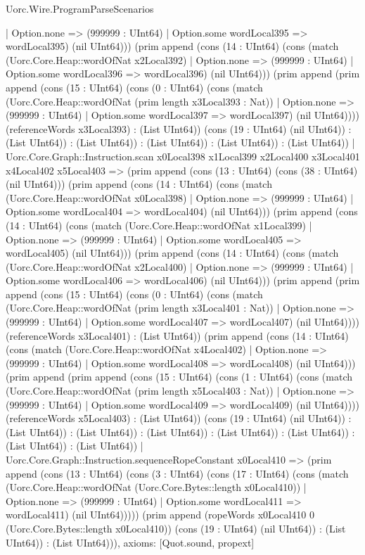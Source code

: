 \begin{lexlean}{Uorc.Wire.ProgramParseScenarios}
\begin{semanticmodule}
{      | Option.none => (999999 : UInt64)
      | Option.some wordLocal395 => wordLocal395) (nil UInt64))) (prim append (cons (14 : UInt64) (cons (match (Uorc.Core.Heap::wordOfNat x2Local392)
      | Option.none => (999999 : UInt64)
      | Option.some wordLocal396 => wordLocal396) (nil UInt64))) (prim append (prim append (cons (15 : UInt64) (cons (0 : UInt64) (cons (match (Uorc.Core.Heap::wordOfNat (prim length x3Local393 : Nat))
      | Option.none => (999999 : UInt64)
      | Option.some wordLocal397 => wordLocal397) (nil UInt64)))) (referenceWords x3Local393) : (List UInt64)) (cons (19 : UInt64) (nil UInt64)) : (List UInt64)) : (List UInt64)) : (List UInt64)) : (List UInt64)) : (List UInt64))
    | Uorc.Core.Graph::Instruction.scan x0Local398 x1Local399 x2Local400 x3Local401 x4Local402 x5Local403 => (prim append (cons (13 : UInt64) (cons (38 : UInt64) (nil UInt64))) (prim append (cons (14 : UInt64) (cons (match (Uorc.Core.Heap::wordOfNat x0Local398)
      | Option.none => (999999 : UInt64)
      | Option.some wordLocal404 => wordLocal404) (nil UInt64))) (prim append (cons (14 : UInt64) (cons (match (Uorc.Core.Heap::wordOfNat x1Local399)
      | Option.none => (999999 : UInt64)
      | Option.some wordLocal405 => wordLocal405) (nil UInt64))) (prim append (cons (14 : UInt64) (cons (match (Uorc.Core.Heap::wordOfNat x2Local400)
      | Option.none => (999999 : UInt64)
      | Option.some wordLocal406 => wordLocal406) (nil UInt64))) (prim append (prim append (cons (15 : UInt64) (cons (0 : UInt64) (cons (match (Uorc.Core.Heap::wordOfNat (prim length x3Local401 : Nat))
      | Option.none => (999999 : UInt64)
      | Option.some wordLocal407 => wordLocal407) (nil UInt64)))) (referenceWords x3Local401) : (List UInt64)) (prim append (cons (14 : UInt64) (cons (match (Uorc.Core.Heap::wordOfNat x4Local402)
      | Option.none => (999999 : UInt64)
      | Option.some wordLocal408 => wordLocal408) (nil UInt64))) (prim append (prim append (cons (15 : UInt64) (cons (1 : UInt64) (cons (match (Uorc.Core.Heap::wordOfNat (prim length x5Local403 : Nat))
      | Option.none => (999999 : UInt64)
      | Option.some wordLocal409 => wordLocal409) (nil UInt64)))) (referenceWords x5Local403) : (List UInt64)) (cons (19 : UInt64) (nil UInt64)) : (List UInt64)) : (List UInt64)) : (List UInt64)) : (List UInt64)) : (List UInt64)) : (List UInt64)) : (List UInt64))
    | Uorc.Core.Graph::Instruction.sequenceRopeConstant x0Local410 => (prim append (cons (13 : UInt64) (cons (3 : UInt64) (cons (17 : UInt64) (cons (match (Uorc.Core.Heap::wordOfNat (Uorc.Core.Bytes::length x0Local410))
      | Option.none => (999999 : UInt64)
      | Option.some wordLocal411 => wordLocal411) (nil UInt64))))) (prim append (ropeWords x0Local410 0 (Uorc.Core.Bytes::length x0Local410)) (cons (19 : UInt64) (nil UInt64)) : (List UInt64)) : (List UInt64))),
  axioms: [Quot.sound, propext]
}


\end{semanticmodule}
\end{lexlean}
